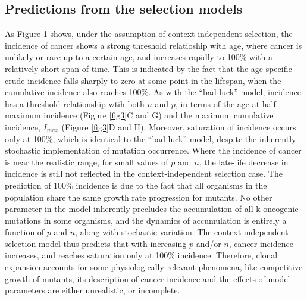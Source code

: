 \documentclass[9pt,twocolumn,twoside]{pnas-new}
\begin{document}
\subsection*{Predictions from the selection models}
As Figure 1 shows, under the assumption of context-independent selection, the incidence of cancer shows a strong threshold relatioship with age, where cancer is unlikely or rare up to a certain age, and increases rapidly to 100\% with a relatively short span of time. This is indicated by the fact that the age-specific crude incidence falls sharply to zero at some point in the lifespan, when the cumulative incidence also reaches 100\%. As with the ``bad luck'' model, incidence has a threshold relationship wtih both $n$ and $p$, in terms of the age at half-maximum incidence (Figure \ref{fig3}C and G) and the maximum cumulative incidence, $I_{max}$ (Figure \ref{fig3}D and H). Moreover, saturation of incidence occurs only at 100\%, which is identical to the ``bad luck'' model, despite the inherently stochastic implementation of mutation occurrence. Where the incidence of cancer is near the realistic range, for small values of $p$ and $n$, the late-life decrease in incidence is still not reflected in the context-independent selection case. The prediction of 100\% incidence is due to the fact that all organisms in the population share the same growth rate progression for mutants. No other parameter in the model inherently precludes the accumulation of all k oncogenic mutations in some organisms, and the dynamics of accumulation is entirely a function of $p$ and $n$, along with stochastic variation. The context-independent selection model thus predicts that with increasing $p$ and/or $n$, cancer incidence increases, and reaches saturation only at 100\% incidence. Therefore, clonal expansion accounts for some physiologically-relevant phenomena, like competitive growth of mutants, its description of cancer incidence and the effects of model parameters are either unrealistic, or incomplete.
\end{document}
